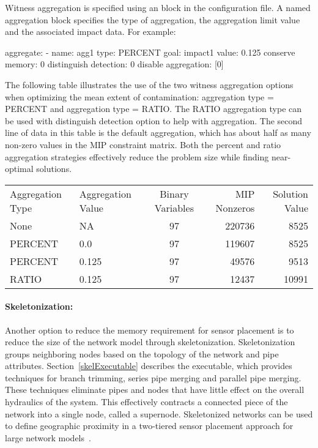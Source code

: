 Witness aggregation is specified using an  block
in the  configuration file. A named aggregation block
specifies the type of aggregation, the aggregation limit value and
the associated impact data. For example:\newline
\begin{minipage}{\textwidth}
\begin{unknownListing}
aggregate: 
- name: agg1
  type: PERCENT
  goal: impact1
  value: 0.125
  conserve memory: 0
  distinguish detection: 0
  disable aggregation: [0]
\end{unknownListing}
\end{minipage}

The following table illustrates the use of the two witness aggregation
options when optimizing the mean extent of contamination: aggregation
type = PERCENT and aggregation type = RATIO. The RATIO aggregation
type can be used with distinguish detection option to help with
aggregation. The second line of data in this table is the default
aggregation, which has about half as many non-\/zero values in the
MIP constraint matrix. Both the percent and ratio aggregation
strategies effectively reduce the problem size while finding
near-\/optimal solutions.

\begin{center}
\begin{tabularx}{\textwidth}{|l|l|c|r|r|} \cline{1-5}
Aggregation Type & Aggregation Value & Binary Variables & MIP Nonzeros&Solution Value  \\\cline{1-5}
None&NA&97&220736&8525  \\\cline{1-5}
PERCENT&0.0&97&119607&8525  \\\cline{1-5}
PERCENT&0.125&97&49576&9513  \\\cline{1-5}
RATIO&0.125&97&12437&10991  \\\cline{1-5}
\end{tabularx}
\end{center} 

\paragraph{Skeletonization:} 
Another option to reduce the memory
requirement for sensor placement is to reduce the size of the network
model through skeletonization. Skeletonization groups neighboring
nodes based on the topology of the network and pipe attributes.
Section~\ref{skelExecutable} describes the 
executable, which provides techniques for branch trimming, series
pipe merging and parallel pipe merging. These techniques eliminate
pipes and nodes that have little effect on the overall hydraulics
of the system. This effectively contracts a connected piece of the
network into a single node, called a supernode. Skeletonized
networks can be used to define geographic proximity in a two-tiered
sensor placement approach for large network models~\citep{KliPhiJan13}.

